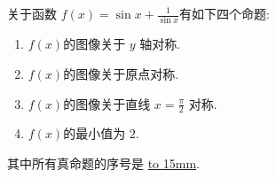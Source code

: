 \documentclass[class=ctexart,crop=false]{standalone}
\begin{document}
关于函数 $f(x)=\sin x+\frac{1}{\sin x}$有如下四个命题:\\
\begin{enumerate}[label=\protect\circled{\arabic*}]
    \item $f(x)$的图像关于 $y$ 轴对称.
    
    \item $f(x)$的图像关于原点对称.
    \item $f(x)$的图像关于直线 $x=\frac{\pi}{2}$ 对称.
    \item $f(x)$的最小值为 $2$.
\end{enumerate}
其中所有真命题的序号是 \underline{\hbox to 15mm{}}.
\end{document}
